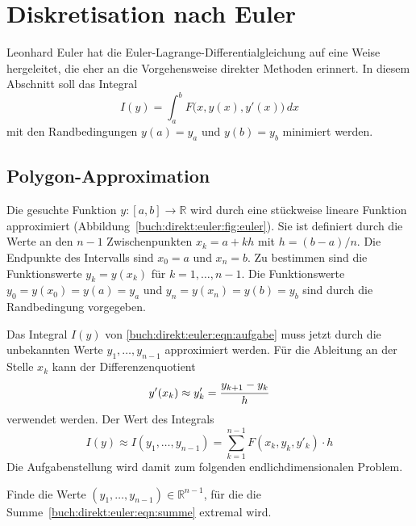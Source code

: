 %
%
%
\section{Diskretisation nach Euler
\label{buch:direkt:section:euler}}
Leonhard Euler
%
%
hat die Euler-Lagrange-Differentialgleichung auf eine Weise hergeleitet,
die eher an die Vorgehensweise direkter Methoden erinnert.
In diesem Abschnitt soll das Integral
\begin{equation}
I(y)
=
\int_a^b
F\bigl(x,y(x),y'(x)\bigr)
\,dx
\label{buch:direkt:euler:eqn:aufgabe}
\end{equation}
mit den Randbedingungen $y(a)=y_a$ und $y(b)=y_b$ minimiert werden.

%
%
\subsection{Polygon-Approximation
\label{buch:direkt:euler:subsection:polygon}}

Die gesuchte Funktion $y\colon[a,b]\to\mathbb{R}$ wird durch eine stückweise
lineare Funktion approximiert (Abbildung~\ref{buch:direkt:euler:fig:euler}).
Sie ist definiert durch die Werte an den $n-1$ Zwischenpunkten
$x_k=a+kh$ mit $h=(b-a)/n$.
Die Endpunkte des Intervalls sind $x_0=a$ und $x_n=b$.
Zu bestimmen sind die Funktionswerte $y_k = y(x_k)$ für $k=1,\dots,n-1$.
Die Funktionswerte $y_0=y(x_0)=y(a)=y_a$ und $y_n=y(x_n)=y(b)=y_b$ 
sind durch die Randbedingung vorgegeben.

Das Integral $I(y)$ von \eqref{buch:direkt:euler:eqn:aufgabe} muss
jetzt durch die unbekannten Werte $y_1,\dots,y_{n-1}$ approximiert
werden.
Für die Ableitung an der Stelle $x_k$ kann der Differenzenquotient
\[
y'(x_k) 
\approx
y'_k
=
\frac{y_{k+1\mathstrut}-y_{k\mathstrut}}{h}
\]
verwendet werden.
Der Wert des Integrals 
\begin{equation}
I(y)
\approx
I(y_1,\dots,y_{n-1})
=
\sum_{k=1}^{n-1}
F(x_k, y_k, y'_k)\cdot h
\label{buch:direkt:euler:eqn:summe}
\end{equation}
Die Aufgabenstellung wird damit zum folgenden endlichdimensionalen
Problem.

\begin{aufgabe}
Finde die Werte $(y_1,\dots,y_{n-1})\in\mathbb{R}^{n-1}$, für die
die Summe~\eqref{buch:direkt:euler:eqn:summe} extremal wird.
\end{aufgabe}

